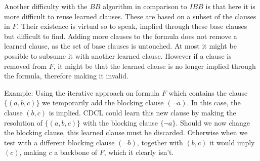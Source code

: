 Another difficulty with the $BB$ algorithm in comparison to $IBB$ is that here it is more difficult to reuse learned clauses. These are based on a subset of the clauses in $F$. Their existence is virtual so to speak, implied through these base clauses but difficult to find. Adding more clauses to the formula does not remove a learned clause, as the set of base clauses is untouched. At most it might be possible to subsume it with another learned clause. However if a clause is removed from $F$, it might be that the learned clause is no longer implied through the formula, therefore making it invalid. 


Example: Using the iterative approach on formula $F$ which contains the clause $\{(a,b,c)\}$ we temporarily add the blocking clause $(\neg a)$. In this case, the clause $(b,c)$ is implied. CDCL could learn this new clause by making the resolution of $\{(a,b,c)\}$ with the blocking clause $\{\neg a\}$. Should we now change the blocking clause, this learned clause must be discarded. Otherwise when we test with a different blocking clause $(\neg b)$, together with $(b,c)$ it would imply $(c)$, making $c$ a backbone of $F$, which it clearly isn't.


